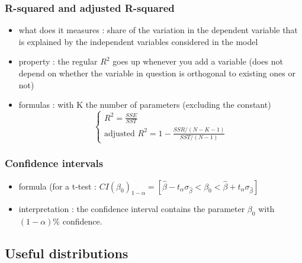 \documentclass{article}
\begin{document}
\subsubsection{R-squared and adjusted R-squared}
\begin{itemize}
    \item what does it measures : share of the variation in the dependent variable that is explained by the independent variables considered in the model
    \item property : the regular $R^2$ goes up whenever you add a variable (does not depend on whether the variable in question is orthogonal to existing ones or not)
    \item formulas : with K the number of parameters (excluding the constant)
    \begin{equation}
    \left\{
    \begin{aligned}
            R^2 = \frac{SSE}{SST}\\
            \text{adjusted } R^2 = 1-\frac{SSR/(N-K-1)}{SST/(N-1)}
    \end{aligned}
    \right.
    \end{equation}
\end{itemize}

\subsubsection{Confidence intervals}
\begin{itemize}
    \item formula (for a t-test : $CI(\beta_0)_{1-\alpha} = [\hat{\beta}-t_\alpha\sigma_{\hat{\beta}} < \beta_0 < \hat{\beta}+t_\alpha\sigma_{\hat{\beta}}]$
    \item interpretation : the confidence interval contains the parameter $\beta_0$ with $(1-\alpha)\%$ confidence.
\end{itemize}

\subsection{Useful distributions}
\end{document}
